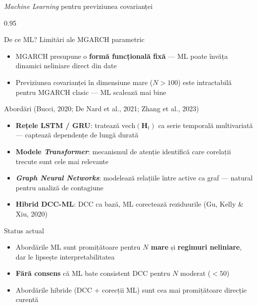\documentclass[9pt, aspectratio=169, t]{beamer}
\begin{document}
\begin{frame}{\textit{Machine Learning} pentru previziunea covarianței}
    \begin{cminipage}{0.95\textwidth}
    \vspace{-2mm}
    {\scriptsize
    \begin{block}{De ce ML? Limitări ale MGARCH parametric}
        \begin{itemize}\setlength{\itemsep}{0pt}
            \item MGARCH presupune o \textbf{formă funcțională fixă} --- ML poate învăța dinamici neliniare direct din date
            \item Previziunea covarianței în dimensiune mare ($N > 100$) este intractabilă pentru MGARCH clasic --- ML scalează mai bine
        \end{itemize}
    \end{block}
    \vspace{-1mm}
    \begin{block}{Abordări (Bucci, 2020; De Nard et al., 2021; Zhang et al., 2023)}
        \begin{itemize}\setlength{\itemsep}{0pt}
            \item \textbf{Rețele LSTM / GRU}: tratează $\text{vech}(\mathbf{H}_t)$ ca serie temporală multivariată --- captează dependențe de lungă durată
            \item \textbf{Modele \textit{Transformer}}: mecanismul de atenție identifică care corelații trecute sunt cele mai relevante
            \item \textbf{\textit{Graph Neural Networks}}: modelează relațiile între active ca graf --- natural pentru analiză de contagiune
            \item \textbf{Hibrid DCC-ML}: DCC ca bază, ML corectează reziduurile (Gu, Kelly \& Xiu, 2020)
        \end{itemize}
    \end{block}
    \vspace{-1mm}
    \begin{alertblock}{Status actual}
        \begin{itemize}\setlength{\itemsep}{0pt}
            \item Abordările ML sunt promițătoare pentru \textbf{$N$ mare} și \textbf{regimuri neliniare}, dar le lipsește interpretabilitatea
            \item \textbf{Fără consens} că ML bate consistent DCC pentru $N$ moderat ($< 50$)
            \item Abordările hibride (DCC + corecții ML) sunt cea mai promițătoare direcție curentă
        \end{itemize}
    \end{alertblock}
    }
    \end{cminipage}
\end{frame}
\end{document}
